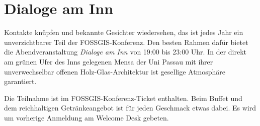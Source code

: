 \newpage
\thispagestyle{mensastyle}
\section*{Dialoge am Inn}
\label{social-event}
Kontakte knüpfen und bekannte Gesichter wiedersehen, das ist jedes Jahr ein unverzichtbarer Teil der
FOSSGIS-Konferenz. Den besten Rahmen dafür bietet die Abendveranstaltung \emph{Dialoge am Inn} von 19:00
bis 23:00 Uhr. In der
direkt am grünen Ufer des Inns gelegenen Mensa der Uni Passau mit ihrer unverwechselbar offenen
Holz-Glas-Architektur ist gesellige Atmosphäre garantiert.

Die Teilnahme ist im
FOSSGIS-Konferenz-Ticket enthalten. Beim Buffet und dem reichhaltigen Getränkeangebot ist für jeden
Geschmack etwas dabei. Es wird um vorherige Anmeldung am Welcome Desk gebeten.
\newpage
